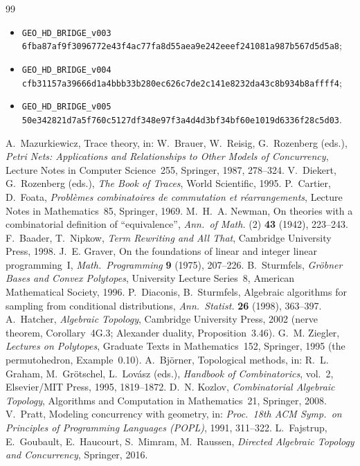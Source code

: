 \begin{thebibliography}{99}
\begin{itemize}[leftmargin=1.4em,itemsep=1pt,topsep=2pt]
\item\texttt{GEO\_HD\_BRIDGE\_v003} \texttt{6fba87af9f3096772e43f4ac77fa8d55aea9e242eeef241081a987b567d5d5a8};
\item\texttt{GEO\_HD\_BRIDGE\_v004} \texttt{cfb31157a39666d1a4bbb33b280ec626c7de2c141e8232da43c8b934b8affff4};
\item\texttt{GEO\_HD\_BRIDGE\_v005} \texttt{50e342821d7a5f760c5127df348e97f3a4d4d3bf34bf60e1019d6336f28c5d03}.
\end{itemize}
 A.~Mazurkiewicz, Trace theory, in: W.~Brauer, W.~Reisig, G.~Rozenberg (eds.), \emph{Petri Nets: Applications and Relationships to Other Models of Concurrency}, Lecture Notes in Computer Science~255, Springer, 1987, 278--324.
 V.~Diekert, G.~Rozenberg (eds.), \emph{The Book of Traces}, World Scientific, 1995.
 P.~Cartier, D.~Foata, \emph{Probl\`emes combinatoires de commutation et r\'earrangements}, Lecture Notes in Mathematics~85, Springer, 1969.
 M.~H.~A. Newman, On theories with a combinatorial definition of ``equivalence'', \emph{Ann.\ of Math.} (2) \textbf{43} (1942), 223--243.
 F.~Baader, T.~Nipkow, \emph{Term Rewriting and All That}, Cambridge University Press, 1998.
 J.~E. Graver, On the foundations of linear and integer linear programming~I, \emph{Math.\ Programming} \textbf{9} (1975), 207--226.
 B.~Sturmfels, \emph{Gr\"obner Bases and Convex Polytopes}, University Lecture Series~8, American Mathematical Society, 1996.
 P.~Diaconis, B.~Sturmfels, Algebraic algorithms for sampling from conditional distributions, \emph{Ann.\ Statist.} \textbf{26} (1998), 363--397.
 A.~Hatcher, \emph{Algebraic Topology}, Cambridge University Press, 2002 (nerve theorem, Corollary~4G.3; Alexander duality, Proposition~3.46).
 G.~M. Ziegler, \emph{Lectures on Polytopes}, Graduate Texts in Mathematics~152, Springer, 1995 (the permutohedron, Example~0.10).
 A.~Bj\"orner, Topological methods, in: R.~L. Graham, M.~Gr\"otschel, L.~Lov\'asz (eds.), \emph{Handbook of Combinatorics}, vol.~2, Elsevier/MIT Press, 1995, 1819--1872.
 D.~N. Kozlov, \emph{Combinatorial Algebraic Topology}, Algorithms and Computation in Mathematics~21, Springer, 2008.
 V.~Pratt, Modeling concurrency with geometry, in: \emph{Proc.\ 18th ACM Symp.\ on Principles of Programming Languages (POPL)}, 1991, 311--322.
 L.~Fajstrup, E.~Goubault, E.~Haucourt, S.~Mimram, M.~Raussen, \emph{Directed Algebraic Topology and Concurrency}, Springer, 2016.
\end{thebibliography}
